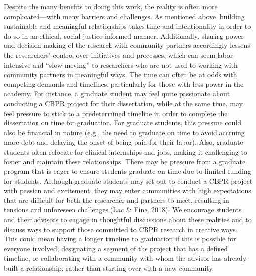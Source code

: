 \documentclass[
  11pt,
]{book}
\begin{document}
Despite the many benefits to doing this work, the reality is often more complicated---with many barriers and challenges. As mentioned above, building sustainable and meaningful relationships takes time and intentionality in order to do so in an ethical, social justice-informed manner. Additionally, sharing power and decision-making of the research with community partners accordingly lessens the researchers' control over initiatives and processes, which can seem labor-intensive and ``slow moving'' to researchers who are not used to working with community partners in meaningful ways. The time can often be at odds with competing demands and timelines, particularly for those with less power in the academy. For instance, a graduate student may feel quite passionate about conducting a CBPR project for their dissertation, while at the same time, may feel pressure to stick to a predetermined timeline in order to complete the dissertation on time for graduation. For graduate students, this pressure could also be financial in nature (e.g., the need to graduate on time to avoid accruing more debt and delaying the onset of being paid for their labor). Also, graduate students often relocate for clinical internships and jobs, making it challenging to foster and maintain these relationships. There may be pressure from a graduate program that is eager to ensure students graduate on time due to limited funding for students. Although graduate students may set out to conduct a CBPR project with passion and excitement, they may enter communities with high expectations that are difficult for both the researcher and partners to meet, resulting in tensions and unforeseen challenges (Lac \& Fine, 2018). We encourage students and their advisors to engage in thoughtful discussions about these realities and to discuss ways to support those committed to CBPR research in creative ways. This could mean having a longer timeline to graduation if this is possible for everyone involved, designating a segment of the project that has a defined timeline, or collaborating with a community with whom the advisor has already built a relationship, rather than starting over with a new community.
\end{document}
